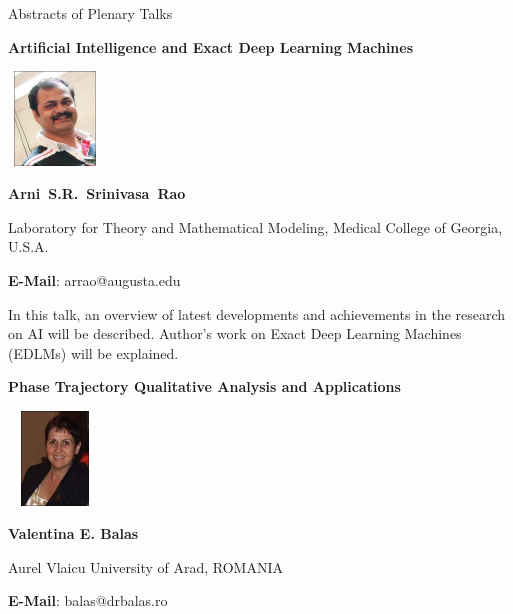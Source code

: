 \documentclass[twoside,11pt]{amsart}
\begin{document}
\newpage

\newpage



\vspace*{85mm}

{\Huge
\begin{center}
Abstracts of Plenary Talks

\end{center}
}



\newpage
\vskip 10mm
\begin{center}\bf\LARGE
Artificial Intelligence and Exact Deep Learning Machines
\end{center}
\vskip 5mm
\begin{center}
\includegraphics[width=2.5cm, height=2.5cm, keepaspectratio=false]{ASR2.jpg}
\end{center}
\vskip 2mm
\centerline{\textbf{Arni S.R. Srinivasa Rao}}
\vskip 2mm
\begin{flushleft}
Laboratory for Theory and Mathematical Modeling, Medical College of
Georgia, U.S.A.
\end{flushleft}
\vskip 5mm
\begin{flushleft}
\textbf{E-Mail}: arrao@augusta.edu
\end{flushleft}

\vskip 8mm
In this talk, an overview of latest developments and achievements in the
research on AI will be described. Author's work on Exact Deep Learning Machines (EDLMs)
will be explained.
\vskip 2mm
\newpage
\vskip 2mm
\begin{center}\bf\LARGE
Phase Trajectory Qualitative Analysis and Applications
\end{center}
\vskip 5mm
\begin{center}
\includegraphics[width=2.5cm, height=2.5cm,keepaspectratio=false]{VEB2.jpg}
\end{center}
\vskip 5mm
\centerline{\textbf{  	Valentina E. Balas }}
\vskip 2mm
\begin{flushleft}
Aurel Vlaicu University of Arad, ROMANIA
\end{flushleft}
\vskip 2mm
\begin{flushleft}
\textbf{E-Mail}: balas@drbalas.ro
\end{flushleft}
\end{document}
